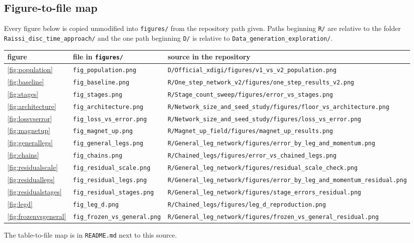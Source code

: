 \documentclass[11pt,a4paper]{article}
\begin{document}
\subsection*{Figure-to-file map}

Every figure below is copied unmodified into \texttt{figures/} from the
repository path given. Paths beginning \texttt{R/} are relative to the folder
\texttt{Raissi\_disc\_time\_approach/} and the one path beginning \texttt{D/} is
relative to \texttt{Data\_generation\_exploration/}.

\begin{table}[htbp]
  \centering
  \scriptsize
  \setlength{\tabcolsep}{5pt}
  \begin{tabular}{lll}
    \toprule
    figure & file in \texttt{figures/} & source in the repository \\
    \midrule
    \ref{fig:population} & \texttt{fig\_population.png}
      & \texttt{D/Official\_xdigi/figures/v1\_vs\_v2\_population.png} \\
    \ref{fig:baseline} & \texttt{fig\_baseline.png}
      & \texttt{R/One\_step\_network\_v2/figures/one\_step\_results\_v2.png} \\
    \ref{fig:stages} & \texttt{fig\_stages.png}
      & \texttt{R/Stage\_count\_sweep/figures/error\_vs\_stages.png} \\
    \ref{fig:architecture} & \texttt{fig\_architecture.png}
      & \texttt{R/Network\_size\_and\_seed\_study/figures/floor\_vs\_architecture.png} \\
    \ref{fig:lossvserror} & \texttt{fig\_loss\_vs\_error.png}
      & \texttt{R/Network\_size\_and\_seed\_study/figures/loss\_vs\_error.png} \\
    \ref{fig:magnetup} & \texttt{fig\_magnet\_up.png}
      & \texttt{R/Magnet\_up\_field/figures/magnet\_up\_results.png} \\
    \ref{fig:generallegs} & \texttt{fig\_general\_legs.png}
      & \texttt{R/General\_leg\_network/figures/error\_by\_leg\_and\_momentum.png} \\
    \ref{fig:chains} & \texttt{fig\_chains.png}
      & \texttt{R/Chained\_legs/figures/error\_vs\_chained\_legs.png} \\
    \ref{fig:residualscale} & \texttt{fig\_residual\_scale.png}
      & \texttt{R/General\_leg\_network/figures/residual\_scale\_check.png} \\
    \ref{fig:residuallegs} & \texttt{fig\_residual\_legs.png}
      & \texttt{R/General\_leg\_network/figures/error\_by\_leg\_and\_momentum\_residual.png} \\
    \ref{fig:residualstages} & \texttt{fig\_residual\_stages.png}
      & \texttt{R/General\_leg\_network/figures/stage\_errors\_residual.png} \\
    \ref{fig:legd} & \texttt{fig\_leg\_d.png}
      & \texttt{R/Chained\_legs/figures/leg\_d\_reproduction.png} \\
    \ref{fig:frozenvsgeneral} & \texttt{fig\_frozen\_vs\_general.png}
      & \texttt{R/General\_leg\_network/figures/frozen\_vs\_general\_residual.png} \\
    \bottomrule
  \end{tabular}
\end{table}

The table-to-file map is in \texttt{README.md} next to this source.



\end{document}
